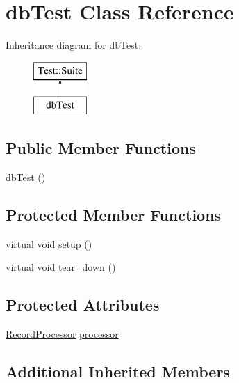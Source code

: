 \hypertarget{classdb_test}{}\section{db\+Test Class Reference}
\label{classdb_test}
Inheritance diagram for db\+Test\+:\begin{figure}[H]
\begin{center}
\leavevmode
\includegraphics[height=2.000000cm]{classdb_test}
\end{center}
\end{figure}
\subsection*{Public Member Functions}
\begin{DoxyCompactItemize}
\item 
\mbox{\hyperlink{classdb_test_aef2697ca1fc1a9368f220d8b5e62402d}{db\+Test}} ()
\end{DoxyCompactItemize}
\subsection*{Protected Member Functions}
\begin{DoxyCompactItemize}
\item 
virtual void \mbox{\hyperlink{classdb_test_aeefb6e8d64ee6e03da89cb5573d60b31}{setup}} ()
\item 
virtual void \mbox{\hyperlink{classdb_test_a1fa8de6f80f7578356b0f8feb8dcdd8f}{tear\+\_\+down}} ()
\end{DoxyCompactItemize}
\subsection*{Protected Attributes}
\begin{DoxyCompactItemize}
\item 
\mbox{\hyperlink{class_record_processor}{Record\+Processor}} \mbox{\hyperlink{classdb_test_a9edd9165f54a1ad52545ebff71686735}{processor}}
\end{DoxyCompactItemize}
\subsection*{Additional Inherited Members}


